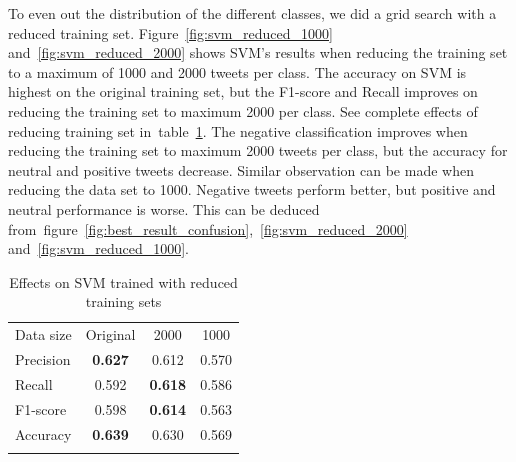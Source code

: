 To even out the distribution of the different classes, we did a grid search with a reduced training set. Figure~\ref{fig:svm_reduced_1000} and~\ref{fig:svm_reduced_2000} shows SVM's results when reducing the training set to a maximum of 1000 and 2000 tweets per class. The accuracy on SVM is highest on the original training set, but the F1-score and Recall improves on reducing the training set to maximum 2000 per class. See complete effects of reducing training set in~table~\ref{tab:svm_reduced}. The negative classification improves when reducing the training set to maximum 2000 tweets per class, but the accuracy for neutral and positive tweets decrease. Similar observation can be made when reducing the data set to 1000. Negative tweets perform better, but positive and neutral performance is worse. This can be deduced from~figure~\ref{fig:best_result_confusion},~\ref{fig:svm_reduced_2000} and~\ref{fig:svm_reduced_1000}.


\begin{table}[!htb]
	\centering
	\begin{tabular}{l|ccc} 
	\noalign{\smallskip}\hline\noalign{\smallskip}
	Data size  & Original       & 2000   & 1000 \\
	\noalign{\smallskip}\hline\noalign{\smallskip}
	Precision  & {\bf 0.627}  & 0.612 & 0.570 \\
	Recall       & 0.592  & \textbf{0.618} & 0.586 \\
	F1-score  & 0.598  & \textbf{0.614} & 0.563 \\
	Accuracy & {\bf 0.639}  & 0.630 & 0.569 \\
	\noalign{\smallskip}\hline\noalign{\smallskip}
	\end{tabular}
	\caption{Effects on SVM trained with reduced training sets}
	\label{tab:svm_reduced}
\end{table}


